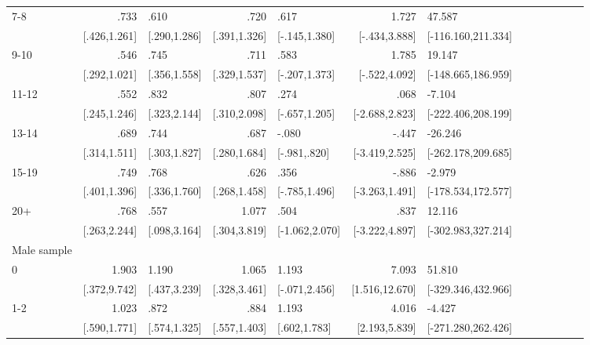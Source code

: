 \begin{table}[h]
\begin{adjustbox}{max width=\linewidth}
\begin{threeparttable}
{\begin{tabular}{l*{6}{D{.}{.}{-1}l}}
7-8             &            .733&            .610&            .720&            .617&           1.727&          47.587\\
                &    [.426,1.261]&    [.290,1.286]&    [.391,1.326]&   [-.145,1.380]&   [-.434,3.888]&[-116.160,211.334]\\

9-10            &            .546&            .745&            .711&            .583&           1.785&          19.147\\
                &    [.292,1.021]&    [.356,1.558]&    [.329,1.537]&   [-.207,1.373]&   [-.522,4.092]&[-148.665,186.959]\\

11-12           &            .552&            .832&            .807&            .274&            .068&          -7.104\\
                &    [.245,1.246]&    [.323,2.144]&    [.310,2.098]&   [-.657,1.205]&  [-2.688,2.823]&[-222.406,208.199]\\

13-14           &            .689&            .744&            .687&           -.080&           -.447&         -26.246\\
                &    [.314,1.511]&    [.303,1.827]&    [.280,1.684]&    [-.981,.820]&  [-3.419,2.525]&[-262.178,209.685]\\

15-19           &            .749&            .768&            .626&            .356&           -.886&          -2.979\\
                &    [.401,1.396]&    [.336,1.760]&    [.268,1.458]&   [-.785,1.496]&  [-3.263,1.491]&[-178.534,172.577]\\

20+             &            .768&            .557&           1.077&            .504&            .837&          12.116\\
                &    [.263,2.244]&    [.098,3.164]&    [.304,3.819]&  [-1.062,2.070]&  [-3.222,4.897]&[-302.983,327.214]\\	
\midrule
Male sample &&&&&&\\
0               &           1.903&           1.190&           1.065&           1.193&           7.093&          51.810\\
                &    [.372,9.742]&    [.437,3.239]&    [.328,3.461]&   [-.071,2.456]&  [1.516,12.670]&[-329.346,432.966]\\

1-2             &           1.023&            .872&            .884&           1.193&           4.016&          -4.427\\
                &    [.590,1.771]&    [.574,1.325]&    [.557,1.403]&    [.602,1.783]&   [2.193,5.839]&[-271.280,262.426]\\


\end{tabular}}
\end{threeparttable}
\end{adjustbox}
\end{table}
